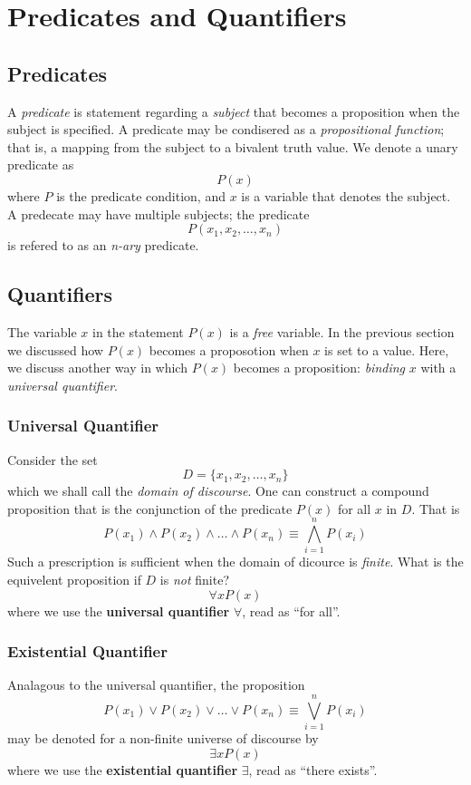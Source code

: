 \documentclass[twocolumn]{report}
\begin{document}
\section{Predicates and Quantifiers}
\subsection{Predicates}
A \textit{predicate} is statement regarding a \textit{subject} that becomes a proposition when the subject is specified.
A predicate may be condisered as a \textit{propositional function}; that is, a mapping from the subject to a bivalent truth value.
We denote a unary predicate as 
\[
	P(x) 
\]
where $P$ is the predicate condition, and $x$ is a variable that denotes the subject.
A predecate may have multiple subjects; the predicate 
\[
	P(x_{1}, x_{2}, \dots, x_{n})
\]
is refered to as an \textit{n-ary} predicate.

\subsection{Quantifiers}
The variable $x$ in the statement $P(x)$ is a \textit{free} variable.
In the previous section we discussed how $P(x)$ becomes a proposotion when $x$ is set to a value.
Here, we discuss another way in which $P(x)$ becomes a proposition: \textit{binding} $x$ with a \textit{universal quantifier}.
\subsubsection{Universal Quantifier}
Consider the set 
\[
	D = \{x_{1}, x_{2}, \dots, x_{n}\}
\]
which we shall call the \textit{domain of discourse}.
One can construct a compound proposition that is the conjunction of the predicate $P(x)$ for all $x$ in $D$. 
That is 
\[
	P(x_{1}) \wedge P(x_{2}) \wedge \dots \wedge P(x_{n}) \equiv \bigwedge_{i=1}^{n}P(x_{i})
\]
Such a prescription is sufficient when the domain of dicource is \textit{finite}.
What is the equivelent proposition if $D$ is \textit{not} finite? 
\[
	\forall x P(x)
\]
where we use the \textbf{universal quantifier} $\forall$, read as ``for all''.

\subsubsection{Existential Quantifier}
Analagous to the universal quantifier, the proposition 
\[
	P(x_{1}) \lor P(x_{2}) \lor \dots \lor P(x_{n}) \equiv \bigvee_{i=1}^{n}P(x_{i})
\]
may be denoted for a non-finite universe of discourse by
\[
	\exists xP(x)
\]
where we use the \textbf{existential quantifier} $\exists$, read as ``there exists''.
\end{document}
